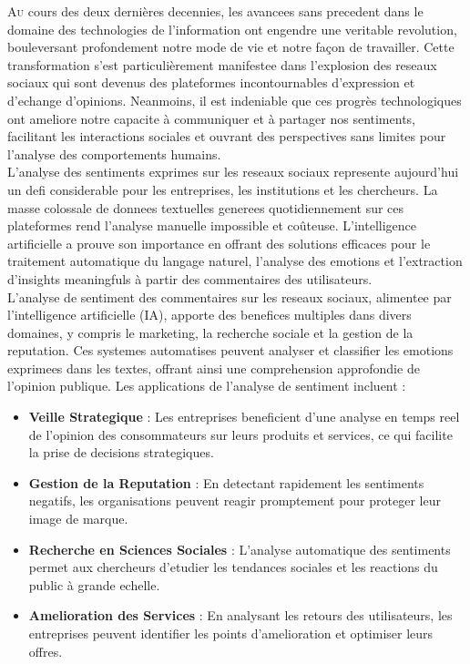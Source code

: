 
\lettrine[nindent=0em, slope=-.5em] {\color{Eblue}A}{u} cours des deux dernières decennies, les avancees sans precedent dans le domaine des technologies de l'information ont engendre une veritable revolution, bouleversant profondement notre mode de vie et notre façon de travailler. Cette transformation s'est particulièrement manifestee dans l'explosion des reseaux sociaux qui sont devenus des plateformes incontournables d'expression et d'echange d'opinions. Neanmoins, il est indeniable que ces progrès technologiques ont ameliore notre capacite à communiquer et à partager nos sentiments, facilitant les interactions sociales et ouvrant des perspectives sans limites pour l'analyse des comportements humains.
\\

L'analyse des sentiments exprimes sur les reseaux sociaux represente aujourd'hui un defi considerable pour les entreprises, les institutions et les chercheurs. La masse colossale de donnees textuelles generees quotidiennement sur ces plateformes rend l'analyse manuelle impossible et coûteuse. L'intelligence artificielle a prouve son importance en offrant des solutions efficaces pour le traitement automatique du langage naturel, l'analyse des emotions et l'extraction d'insights meaningfuls à partir des commentaires des utilisateurs.
\\
L'analyse de sentiment des commentaires sur les reseaux sociaux, alimentee par l'intelligence artificielle (IA), apporte des benefices multiples dans divers domaines, y compris le marketing, la recherche sociale et la gestion de la reputation. Ces systemes automatises peuvent analyser et classifier les emotions exprimees dans les textes, offrant ainsi une comprehension approfondie de l'opinion publique. Les applications de l'analyse de sentiment incluent :
\begin{itemize}
    \item \textbf{Veille Strategique} : Les entreprises beneficient d'une analyse en temps reel de l'opinion des consommateurs sur leurs produits et services, ce qui facilite la prise de decisions strategiques.
    \item \textbf{Gestion de la Reputation} : En detectant rapidement les sentiments negatifs, les organisations peuvent reagir promptement pour proteger leur image de marque.
    \item \textbf{Recherche en Sciences Sociales} : L'analyse automatique des sentiments permet aux chercheurs d'etudier les tendances sociales et les reactions du public à grande echelle.
    \item \textbf{Amelioration des Services} : En analysant les retours des utilisateurs, les entreprises peuvent identifier les points d'amelioration et optimiser leurs offres.
\end{itemize}
\ \\

